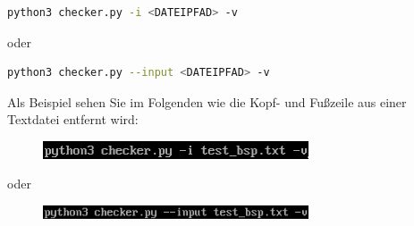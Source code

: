 \documentclass[12pt]{scrartcl}
\begin{document}
\begin{lstlisting}[language=bash]
python3 checker.py -i <DATEIPFAD> -v 
\end{lstlisting}\begin{center}
oder 
\end{center}
\begin{lstlisting}[language=bash]
python3 checker.py --input <DATEIPFAD> -v
\end{lstlisting}
Als Beispiel sehen Sie im Folgenden wie die Kopf- und Fußzeile aus einer Textdatei entfernt wird:
\begin{figure}[htbp]
\centering
\includegraphics[width=0.7\textwidth]{ersteSchritteKopfFuss001}\par\vspace{0.25cm}
\label{fig:ersteSchritteExtract001}
\end{figure}
\begin{center}
oder
\end{center}
\begin{figure}[htbp]
\centering
\includegraphics[width=0.7\textwidth]{ersteSchritteKopfFuss002}\par\vspace{0.25cm}
\label{fig:ersteSchritteExtract002}
\end{figure}

\newpage
\end{document}
